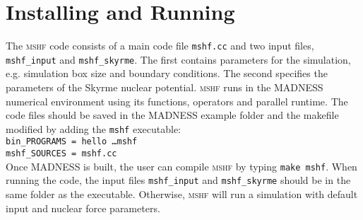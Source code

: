 \documentclass[3p]{elsarticle}
\begin{document}
\section{Installing and Running}
The \textsc{mshf} code consists of a main code file \texttt{mshf.cc} and two input files, \texttt{mshf\_input} and \texttt{mshf\_skyrme}. The first contains parameters for the simulation, e.g. simulation box size and boundary conditions. The second specifies the parameters of the Skyrme nuclear potential. \textsc{mshf} runs in the \textsc{MADNESS} numerical environment using its functions, operators and parallel runtime. The code files should be saved in the \textsc{MADNESS} example folder and the makefile modified by adding the \texttt{mshf} executable:\\
\texttt{bin\_PROGRAMS = hello \dots mshf}\\
\texttt{mshf\_SOURCES = mshf.cc}\\
Once \textsc{MADNESS} is built, the user can compile \textsc{mshf} by typing \texttt{make mshf}. When running the code, the input files \texttt{mshf\_input} and \texttt{mshf\_skyrme} should be in the same folder as the executable. Otherwise, \textsc{mshf} will run a simulation with default input and nuclear force parameters.
\end{document}
